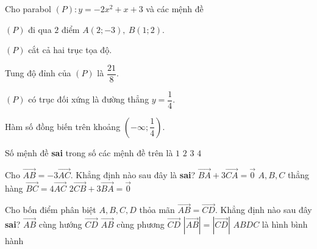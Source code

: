 \begin{ex}%
Cho parabol $(P)\colon y=-2x^2+x+3$ và các mệnh đề
\begin{enumEX}[I.]{2}
\item $(P)$ đi qua $2$ điểm $A(2;-3),\ B(1;2)$.
\item $(P)$ cắt cả hai trục tọa độ.
\item Tung độ đỉnh của $(P)$ là $\dfrac{21}{8}$.
\item $(P)$ có trục đối xứng là đường thẳng $y=\dfrac{1}{4}$.
\item Hàm số đồng biến trên khoảng $\left(-\infty;\dfrac{1}{4}\right)$.
\end{enumEX}
Số mệnh đề \textbf{sai} trong số các mệnh đề trên là
\choice
{$1$}
{\True $2$}
{$3$}
{$4$}
\end{ex}


\begin{ex}%
Cho $\overrightarrow{AB}=-3\overrightarrow{AC}$. Khẳng định nào sau đây là \textbf{sai}?
\choice
{$\overrightarrow{BA}+3\overrightarrow{CA}=\overrightarrow{0}$}
{$A,B,C$ thẳng hàng}
{$\overrightarrow{BC}=4\overrightarrow{AC}$}
{\True $2\overrightarrow{CB}+3\overrightarrow{BA}=\overrightarrow{0}$}
\end{ex}


\begin{ex}%
Cho bốn điểm phân biệt $A,B,C,D$ thỏa mãn $\overrightarrow{AB}=\overrightarrow{CD}$. Khẳng định nào sau đây {\bfseries sai}?
\choice
{$\overrightarrow{AB}$ cùng hướng $\overrightarrow{CD}$}
{$\overrightarrow{AB}$ cùng phương $\overrightarrow{CD}$}
{$|\overrightarrow{AB}|=|\overrightarrow{CD}|$}
{\True $ABDC$ là hình bình hành}
\end{ex}


